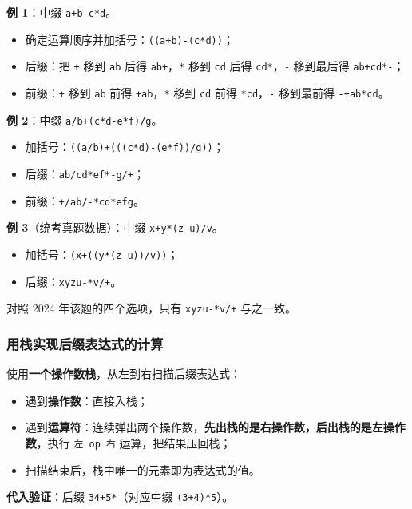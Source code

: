 \documentclass[11pt,openany,UTF8]{ctexbook}
\begin{document}
\textbf{例 1}：中缀 \texttt{a+\allowbreak{}b-c*d}。

\begin{itemize}
\item 确定运算顺序并加括号：\texttt{((a+\allowbreak{}b)\allowbreak{}-(c*d)\allowbreak{})\allowbreak{}}；
\item 后缀：把 \texttt{+\allowbreak{}} 移到 \texttt{ab} 后得 \texttt{ab+\allowbreak{}}，\texttt{*} 移到 \texttt{cd} 后得 \texttt{cd*}，\texttt{-} 移到最后得 \texttt{ab+\allowbreak{}cd*-}；
\item 前缀：\texttt{+\allowbreak{}} 移到 \texttt{ab} 前得 \texttt{+\allowbreak{}ab}，\texttt{*} 移到 \texttt{cd} 前得 \texttt{*cd}，\texttt{-} 移到最前得 \texttt{-+\allowbreak{}ab*cd}。
\end{itemize}
\textbf{例 2}：中缀 \texttt{a/\allowbreak{}b+\allowbreak{}(c*d-e*f)\allowbreak{}/\allowbreak{}g}。

\begin{itemize}
\item 加括号：\texttt{((a/\allowbreak{}b)\allowbreak{}+\allowbreak{}(((c*d)\allowbreak{}-(e*f)\allowbreak{})\allowbreak{}/\allowbreak{}g)\allowbreak{})\allowbreak{}}；
\item 后缀：\texttt{ab/\allowbreak{}cd*ef*-g/\allowbreak{}+\allowbreak{}}；
\item 前缀：\texttt{+\allowbreak{}/\allowbreak{}ab/\allowbreak{}-*cd*efg}。
\end{itemize}
\textbf{例 3}（统考真题数据）：中缀 \texttt{x+\allowbreak{}y*(z-u)\allowbreak{}/\allowbreak{}v}。

\begin{itemize}
\item 加括号：\texttt{(x+\allowbreak{}((y*(z-u)\allowbreak{})\allowbreak{}/\allowbreak{}v)\allowbreak{})\allowbreak{}}；
\item 后缀：\texttt{xyzu-*v/\allowbreak{}+\allowbreak{}}。
\end{itemize}
对照 2024 年该题的四个选项，只有 \texttt{xyzu-*v/\allowbreak{}+\allowbreak{}} 与之一致。

\subsubsection{用栈实现后缀表达式的计算}

使用\textbf{一个操作数栈}，从左到右扫描后缀表达式：

\begin{itemize}
\item 遇到\textbf{操作数}：直接入栈；
\item 遇到\textbf{运算符}：连续弹出两个操作数，\textbf{先出栈的是右操作数，后出栈的是左操作数}，执行 \texttt{左 op 右} 运算，把结果压回栈；
\item 扫描结束后，栈中唯一的元素即为表达式的值。
\end{itemize}
\textbf{代入验证}：后缀 \texttt{34+\allowbreak{}5*}（对应中缀 \texttt{(3+\allowbreak{}4)\allowbreak{}*5}）。
\end{document}
